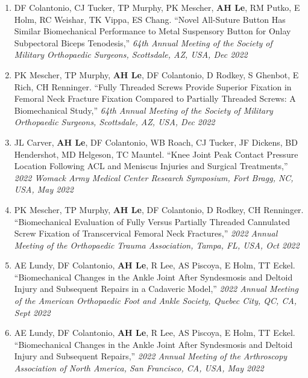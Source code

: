 \documentclass[10pt]{letter}
\begin{document}
\begin{justify}
\begin{enumerate}[leftmargin=*]  
    \item DF Colantonio, CJ Tucker, TP Murphy, PK Mescher, \textbf{AH Le}, RM Putko, E Holm, RC Weishar, TK Vippa, ES Chang.
        ``Novel All-Suture Button Has Similar Biomechanical Performance to Metal Suspensory Button for Onlay Subpectoral Biceps Tenodesis,''
        \textit{64th Annual Meeting of the Society of Military Orthopaedic Surgeons, Scottsdale, AZ, USA, Dec 2022}
        
    \item PK Mescher, TP Murphy, \textbf{AH Le}, DF Colantonio, D Rodkey, S Ghenbot, E Rich, CH Renninger.
        ``Fully Threaded Screws Provide Superior Fixation in Femoral Neck Fracture Fixation Compared to Partially Threaded Screws: A Biomechanical Study,''
        \textit{64th Annual Meeting of the Society of Military Orthopaedic Surgeons, Scottsdale, AZ, USA, Dec 2022}

    \item JL Carver, \textbf{AH Le}, DF Colantonio, WB Roach, CJ Tucker, JF Dickens, BD Hendershot, MD Helgeson, TC Mauntel.
        ``Knee Joint Peak Contact Pressure Location Following ACL and Meniscus Injuries and Surgical Treatments,''
        \textit{2022 Womack Army Medical Center Research Symposium, Fort Bragg, NC, USA, May 2022}

    \item PK Mescher, TP Murphy, \textbf{AH Le}, DF Colantonio, D Rodkey, CH Renninger.
        ``Biomechanical Evaluation of Fully Versus Partially Threaded Cannulated Screw Fixation of Transcervical Femoral Neck Fractures,''
        \textit{2022 Annual Meeting of the Orthopaedic Trauma Association, Tampa, FL, USA, Oct 2022}
        
    \item AE Lundy, DF Colantonio, \textbf{AH Le}, R Lee, AS Piscoya, E Holm, TT Eckel.
        ``Biomechanical Changes in the Ankle Joint After Syndesmosis and Deltoid Injury and Subsequent Repairs in a Cadaveric Model,''
        \textit{2022 Annual Meeting of the American Orthopaedic Foot and Ankle Society, Quebec City, QC, CA, Sept 2022}
    
    \item AE Lundy, DF Colantonio, \textbf{AH Le}, R Lee, AS Piscoya, E Holm, TT Eckel.
        ``Biomechanical Changes in the Ankle Joint After Syndesmosis and Deltoid Injury and Subsequent Repairs,''
        \textit{2022 Annual Meeting of the Arthroscopy Association of North America, San Francisco, CA, USA, May 2022}
    

\end{enumerate}
\end{justify}
\end{document}
